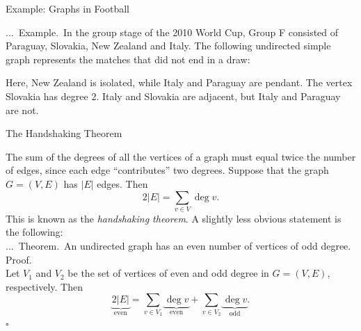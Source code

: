 \documentclass[smaller,hyperref={CJKbookmarks=true}]{beamer}
\newenvironment{PROOF}{{\noindent\!\sf\alert{Proof.}}\\}{\hfill$\square$\\}
\newcounter{zhuo}[subsection]
\renewcommand{\thezhuo}{\thesection.\thesubsection.\arabic{zhuo}}
\newenvironment{EXAMPLE}{\stepcounter{zhuo}\alert{\!\thezhuo.~Example.\,}}{}
\newenvironment{THEOREM}{\stepcounter{zhuo}\alert{\thezhuo.~Theorem.\,}}{}
\begin{document}
\begin{frame}[t]{Example: Graphs in Football}
\begin{spacing}{1}
\begin{EXAMPLE}
In the group stage of the 2010 World Cup, Group F
consisted of Paraguay, Slovakia, New Zealand and Italy. The following
undirected simple graph represents the matches that did not end in a draw:
\begin{center}
\end{center}
Here, New Zealand is isolated, while Italy and Paraguay are pendant. The
vertex Slovakia has degree 2. Italy and Slovakia are adjacent, but Italy and
Paraguay are not.
\end{EXAMPLE}
\end{spacing}
\end{frame}
\begin{frame}[t]{The Handshaking Theorem}
\begin{spacing}{0.9}
The sum of the degrees of all the vertices of a graph must equal twice the
number of edges, since each edge ``contributes'' two degrees. Suppose that the graph $G=(V,E)$ has $|E|$ edges. Then
\[2|E|=\sum_{v\in V}\deg v.\]
This is known as the \emph{handshaking theorem}. A slightly less obvious
statement is the following:\\[5pt]
\begin{THEOREM}
An undirected graph has an even number of vertices of
odd degree.\\[4pt]
\begin{PROOF}
Let $V_1$ and $V_2$ be the set of vertices of even and odd degree in $G=(V,E)$, respectively. Then
\[\underbrace{2|E|}_{\text{even}}=\sum_{v\in V_1}\underbrace{\deg v}_{\text{even}}+\sum_{v\in V_2}\underbrace{\deg v}_{\text{odd}}.\]
\end{PROOF}
\end{THEOREM}
\end{spacing}
\end{frame}
\end{document}
